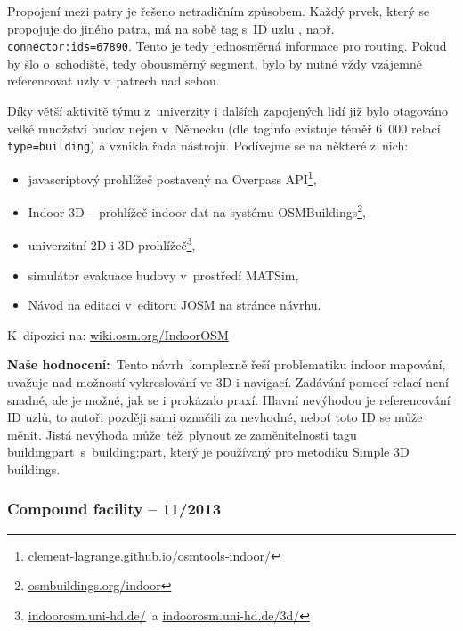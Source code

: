 Propojení mezi patry je řešeno netradičním způsobem. Každý prvek, který se propojuje do jiného patra, má na sobě tag s~ID uzlu , např. \texttt{connector:ids=67890}. Tento  je tedy jednosměrná informace pro routing. Pokud by šlo o~schodiště, tedy obousměrný segment, bylo by nutné vždy vzájemně referencovat uzly v~patrech nad sebou.

Díky větší aktivitě týmu z~univerzity i dalších zapojených lidí již bylo otagováno velké množství budov nejen v~Německu (dle taginfo existuje téměř 6~000 relací \texttt{type=building}\cite{zdroj50}) a vznikla řada nástrojů. Podívejme se na některé z~nich:

\begin{itemize}

\item
  javascriptový prohlížeč postavený na Overpass API\footnote{\href{http://clement-lagrange.github.io/osmtools-indoor/}{clement-lagrange.github.io/osmtools-indoor/}},
\item
  Indoor 3D -- prohlížeč indoor dat na systému OSMBuildings\footnote{\href{http://osmbuildings.org/indoor}{osmbuildings.org/indoor}},
\item
  univerzitní 2D i 3D prohlížeč\footnote{\href{http://indoorosm.uni-hd.de/}{indoorosm.uni-hd.de/}~a \href{http://indoorosm.uni-hd.de/3d/}{indoorosm.uni-hd.de/3d/}},
\item
  simulátor evakuace budovy v~prostředí MATSim,
\item
  Návod na editaci v~editoru JOSM na stránce návrhu.
\end{itemize}

K~dipozici na: \href{http://wiki.osm.org/IndoorOSM}{wiki.osm.org/IndoorOSM}

\textbf{Naše hodnocení:}~Tento návrh~komplexně řeší problematiku indoor mapování, uvažuje nad možností vykreslování ve 3D i navigací. Zadávání pomocí relací není snadné, ale je možné, jak se i prokázalo praxí. Hlavní nevýhodou je referencování ID uzlů, to autoři později sami označili za nevhodné, neboť toto ID se může měnit. Jistá nevýhoda může~též~plynout ze zaměnitelnosti tagu buildingpart~s~building:part, který je používaný pro metodiku Simple 3D buildings.\cite{zdroj51}

\subsubsection{Compound facility -- 11/2013}\label{compound-facility-112013}

